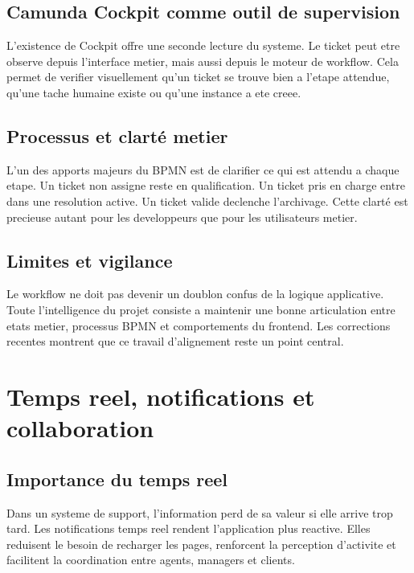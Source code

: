 \documentclass[12pt,a4paper,oneside]{report}
\begin{document}
\section{Camunda Cockpit comme outil de supervision}

L'existence de Cockpit offre une seconde lecture du systeme. Le ticket peut etre observe depuis l'interface metier, mais aussi depuis le moteur de workflow. Cela permet de verifier visuellement qu'un ticket se trouve bien a l'etape attendue, qu'une tache humaine existe ou qu'une instance a ete creee.

\section{Processus et clarté metier}

L'un des apports majeurs du BPMN est de clarifier ce qui est attendu a chaque etape. Un ticket non assigne reste en qualification. Un ticket pris en charge entre dans une resolution active. Un ticket valide declenche l'archivage. Cette clarté est precieuse autant pour les developpeurs que pour les utilisateurs metier.

\section{Limites et vigilance}

Le workflow ne doit pas devenir un doublon confus de la logique applicative. Toute l'intelligence du projet consiste a maintenir une bonne articulation entre etats metier, processus BPMN et comportements du frontend. Les corrections recentes montrent que ce travail d'alignement reste un point central.

\chapter{Temps reel, notifications et collaboration}

\section{Importance du temps reel}

Dans un systeme de support, l'information perd de sa valeur si elle arrive trop tard. Les notifications temps reel rendent l'application plus reactive. Elles reduisent le besoin de recharger les pages, renforcent la perception d'activite et facilitent la coordination entre agents, managers et clients.
\end{document}

